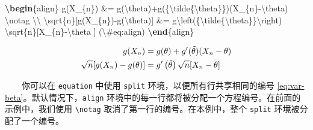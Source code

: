 \documentclass[
  12pt,
]{krantz}
\newenvironment{Shaded}{\begin{snugshade}}{\end{snugshade}}
\newcommand{\ExtensionTok}[1]{#1}
\newcommand{\KeywordTok}[1]{\textcolor[rgb]{0.13,0.29,0.53}{\textbf{#1}}}
\newcommand{\NormalTok}[1]{#1}
\newcommand{\SpecialCharTok}[1]{\textcolor[rgb]{0.00,0.00,0.00}{#1}}
\newcommand{\SpecialStringTok}[1]{\textcolor[rgb]{0.31,0.60,0.02}{#1}}
\theoremstyle{definition}
\theoremstyle{definition}
\theoremstyle{definition}
\theoremstyle{definition}
\theoremstyle{remark}
\begin{document}
\begin{Shaded}
\begin{Highlighting}[]
\KeywordTok{\textbackslash{}begin}\NormalTok{\{}\ExtensionTok{align}\NormalTok{\}}\SpecialStringTok{ }
\SpecialStringTok{g(X\_\{n\}) \&= g(}\SpecialCharTok{\textbackslash{}theta}\SpecialStringTok{)+g\textquotesingle{}(\{}\SpecialCharTok{\textbackslash{}tilde}\SpecialStringTok{\{}\SpecialCharTok{\textbackslash{}theta}\SpecialStringTok{\}\})(X\_\{n\}{-}}\SpecialCharTok{\textbackslash{}theta}\SpecialStringTok{) }\SpecialCharTok{\textbackslash{}notag}\SpecialStringTok{ }\SpecialCharTok{\textbackslash{}\textbackslash{}}
\SpecialCharTok{\textbackslash{}sqrt}\SpecialStringTok{\{n\}[g(X\_\{n\}){-}g(}\SpecialCharTok{\textbackslash{}theta}\SpecialStringTok{)] \&= g\textquotesingle{}}\SpecialCharTok{\textbackslash{}left}\SpecialStringTok{(\{}\SpecialCharTok{\textbackslash{}tilde}\SpecialStringTok{\{}\SpecialCharTok{\textbackslash{}theta}\SpecialStringTok{\}\}}\SpecialCharTok{\textbackslash{}right}\SpecialStringTok{)}
\SpecialStringTok{  }\SpecialCharTok{\textbackslash{}sqrt}\SpecialStringTok{\{n\}[X\_\{n\}{-}}\SpecialCharTok{\textbackslash{}theta}\SpecialStringTok{ ] (}\SpecialCharTok{\textbackslash{}\#}\SpecialStringTok{eq:align)}
\KeywordTok{\textbackslash{}end}\NormalTok{\{}\ExtensionTok{align}\NormalTok{\} }
\end{Highlighting}
\end{Shaded}

\begin{align}
g(X_{n}) &= g(\theta)+g'({\tilde{\theta}})(X_{n}-\theta) \notag \\
\sqrt{n}[g(X_{n})-g(\theta)] &= g'\left({\tilde{\theta}}\right)
  \sqrt{n}[X_{n}-\theta ] \label{eq:align}
\end{align}

  你可以在 \texttt{equation} 中使用 \texttt{split} 环境，以便所有行共享相同的编号 \eqref{eq:var-beta}。默认情况下，\texttt{align} 环境中的每一行都将被分配一个方程编号。在前面的示例中，我们使用 \texttt{\textbackslash{}notag} 取消了第一行的编号。在本例中，整个 \texttt{split} 环境被分配了一个编号。
\end{document}
